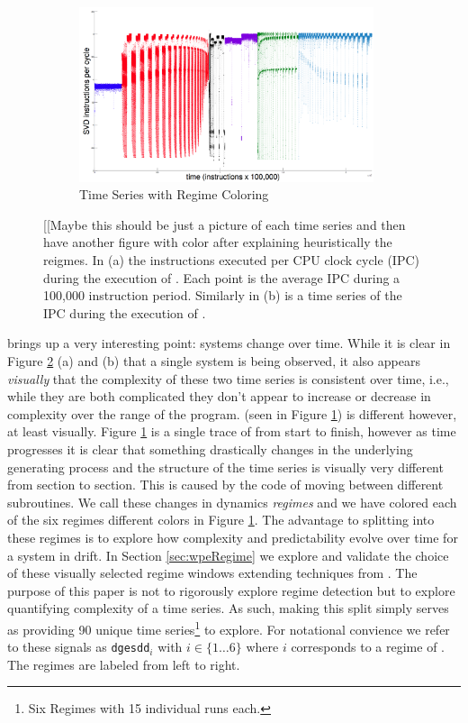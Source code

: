 \begin{figure}[htbp]
\begin{subfigure}[t]{0.475\textwidth}
    \includegraphics[width=0.95\textwidth]{figs/SVD1RegimesColored}
    \caption{\svd Time Series with Regime Coloring}
    \label{fig:svd-ts-colored}
  \end{subfigure}
  \caption{[[Maybe this should be just a picture of each time series and then have another figure with color after explaining heuristically the reigmes. In (a) the instructions executed per CPU clock cycle
    (IPC) during the execution of \col. Each point is the average IPC during a 100,000
    instruction period. Similarly in (b) is a time series of the IPC during the execution of \gcc.}\label{fig:sample-ts}
    \end{figure}

\svd brings up a very interesting point: systems change over time. While it is clear in Figure \ref{fig:sample-ts} (a) and (b) that a single system is being observed, it also appears \emph{visually} that the complexity of these two time series is consistent over time, i.e., while they are both complicated they don't appear to increase or decrease in complexity over the range of the program. \svd (seen in Figure \ref{fig:svd-ts-colored}) is different however, at least visually. Figure \ref{fig:svd-ts-colored} is a single trace of \svd from start to finish, however as time progresses it is clear that something drastically changes in the underlying generating process and the structure of the time series is visually very different from section to section. This is caused by the code of \svd moving between different subroutines. We call these changes in \svd dynamics  \emph{\svd regimes} and we have colored each of the six regimes different colors in Figure \ref{fig:svd-ts-colored}. The advantage to splitting \svd into these regimes is to explore how complexity and predictability evolve over time for a system in drift. In Section \ref{sec:wpeRegime} we explore and validate the choice of these visually selected regime windows extending techniques from \cite{cao2004det}. The purpose of this paper is not to rigorously explore regime detection but to explore quantifying complexity of a time series. As such, making this split simply serves as providing 90 unique time series\footnote{Six Regimes with 15 individual runs each.} to explore. For notational convience we refer to these signals as {\tt dgesdd$_i$} with $i \in \{1\dots6\}$ where $i$ corresponds to a regime of \svd. The regimes are labeled from left to right. 


